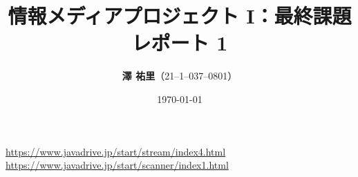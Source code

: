 \documentclass[dvipdfmx]{jsarticle}
\begin{document}
\title{\vspace{10zw}情報メディアプロジェクト I：最終課題レポート 1\\}
\date{\today} %
\author{\Large{\textbf{澤 \/ 祐里}}（21--1--037--0801）} %
 
\thispagestyle{empty}
\maketitle
\thispagestyle{empty}
\clearpage

\setcounter{page}{1}
\setcounter{secnumdepth}{4}
\setcounter{tocdepth}{4}
\hypertarget{mokuji}{\tableofcontents}
\clearpage



\clearpage


\clearpage


\clearpage


\clearpage


\clearpage


\clearpage

\begin{thebibliography}{9}
   \url{https://www.javadrive.jp/start/stream/index4.html}
   \url{https://www.javadrive.jp/start/scanner/index1.html}
\end{thebibliography}
\end{document}
